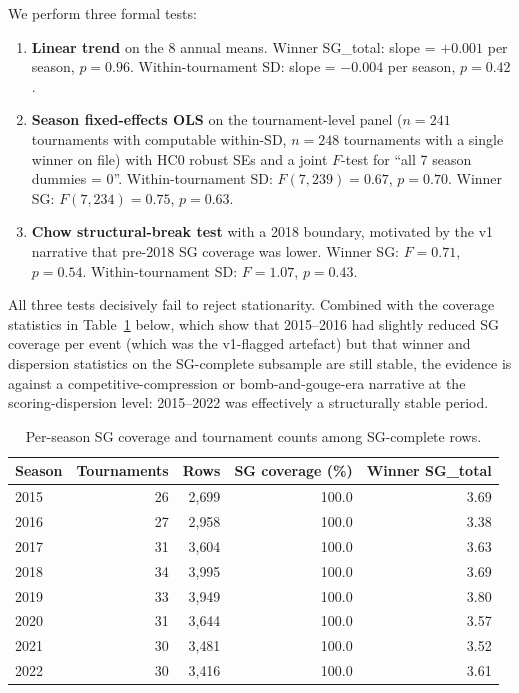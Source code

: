 \documentclass[11pt]{article}
\begin{document}
We perform three formal tests:
\begin{enumerate}[leftmargin=2em,itemsep=0pt]
\item \textbf{Linear trend} on the 8 annual means.  Winner SG\_total: slope = $+0.001$ per season, $p = 0.96$.  Within-tournament SD: slope = $-0.004$ per season, $p = 0.42$.
\item \textbf{Season fixed-effects OLS} on the tournament-level panel ($n = 241$ tournaments with computable within-SD, $n = 248$ tournaments with a single winner on file) with HC0 robust SEs \citep{white1980robust} and a joint $F$-test for ``all 7 season dummies = 0''.  Within-tournament SD: $F(7, 239) = 0.67$, $p = 0.70$.  Winner SG: $F(7, 234) = 0.75$, $p = 0.63$.
\item \textbf{Chow structural-break test} \citep{chow1960tests} with a 2018 boundary, motivated by the v1 narrative that pre-2018 SG coverage was lower.  Winner SG: $F = 0.71$, $p = 0.54$.  Within-tournament SD: $F = 1.07$, $p = 0.43$.
\end{enumerate}

All three tests decisively fail to reject stationarity.  Combined with the coverage statistics in Table~\ref{tab:cov} below, which show that 2015--2016 had slightly reduced SG coverage per event (which was the v1-flagged artefact) but that winner and dispersion statistics on the SG-complete subsample are still stable, the evidence is against a competitive-compression or bomb-and-gouge-era narrative at the scoring-dispersion level: 2015--2022 was effectively a structurally stable period.

\begin{table}[t]
\centering
\small
\caption{Per-season SG coverage and tournament counts among SG-complete rows.}
\label{tab:cov}
\begin{tabular}{lrrrr}
\toprule
Season & Tournaments & Rows & SG coverage (\%) & Winner SG\_total \\
\midrule
2015 & 26 & 2{,}699 & 100.0 & 3.69 \\
2016 & 27 & 2{,}958 & 100.0 & 3.38 \\
2017 & 31 & 3{,}604 & 100.0 & 3.63 \\
2018 & 34 & 3{,}995 & 100.0 & 3.69 \\
2019 & 33 & 3{,}949 & 100.0 & 3.80 \\
2020 & 31 & 3{,}644 & 100.0 & 3.57 \\
2021 & 30 & 3{,}481 & 100.0 & 3.52 \\
2022 & 30 & 3{,}416 & 100.0 & 3.61 \\
\bottomrule
\end{tabular}
\end{table}
\end{document}
